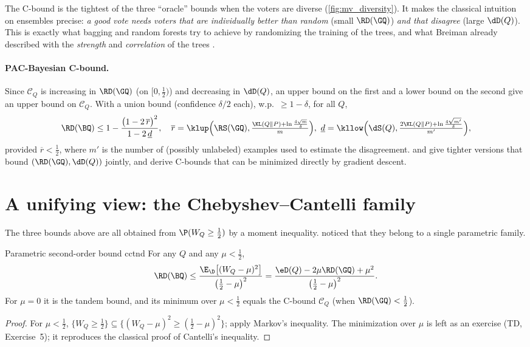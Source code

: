 The C-bound is the tightest of the three ``oracle'' bounds when the voters
are diverse (\cref{fig:mv_diversity}). It makes the classical intuition on
ensembles precise: \emph{a good vote needs voters that are individually
better than random} (small $\RD(\GQ)$) \emph{and that disagree} (large $\dD(Q)$).
This is exactly what bagging and random forests try to achieve by randomizing
the training of the trees, and what Breiman already described with the
\emph{strength} and \emph{correlation} of the trees \citep{breiman2001random}.

\paragraph{PAC-Bayesian C-bound.} Since $\mathcal C_Q$ is increasing in
$\RD(\GQ)$ (on $[0,\frac12)$) and decreasing in $\dD(Q)$, an upper bound on
the first and a lower bound on the second give an upper bound on $\mathcal C_Q$.
With a union bound (confidence $\delta/2$ each), w.p.\ $\geq1-\delta$, for all $Q$,
\begin{equation}\label{eq:cbound_pb}
\RD(\BQ)\leq1-\frac{\big(1-2\,\overline r\big)^2}{1-2\,\underline d},\quad
\overline r=\klup\Big(\RS(\GQ),\tfrac{\KL(Q\|P)+\ln\frac{4\sqrt m}{\delta}}{m}\Big),\
\underline d=\kllow\Big(\dS(Q),\tfrac{2\KL(Q\|P)+\ln\frac{4\sqrt {m'}}{\delta}}{m'}\Big),
\end{equation}
provided $\overline r<\frac12$, where $m'$ is the number of (possibly unlabeled)
examples used to estimate the disagreement. \citet{lacasse2007pac} and
\citet{germain2015risk} give tighter versions that bound $(\RD(\GQ),\dD(Q))$
jointly, and \citet{viallard2021self} derive C-bounds that can be minimized
directly by gradient descent.

\section{A unifying view: the Chebyshev--Cantelli family}\label{sec:cctnd}

The three bounds above are all obtained from $\P(W_Q\geq\frac12)$ by a
moment inequality. \citet{wu2021chebyshev} noticed that they belong to a
single parametric family.

\begin{theorem}{Parametric second-order bound \citep{wu2021chebyshev}}{cctnd}
For any $Q$ and any $\mu<\frac12$,
\begin{equation}\label{eq:cctnd}
\RD(\BQ)\leq\frac{\E_\D\big[(W_Q-\mu)^2\big]}{\big(\frac12-\mu\big)^2}
=\frac{\eD(Q)-2\mu\RD(\GQ)+\mu^2}{\big(\frac12-\mu\big)^2}.
\end{equation}
For $\mu=0$ it is the tandem bound, and its minimum over $\mu<\frac12$ equals
the C-bound $\mathcal C_Q$ (when $\RD(\GQ)<\frac12$).
\end{theorem}
\begin{proof}
For $\mu<\frac12$, $\{W_Q\geq\frac12\}\subseteq\{(W_Q-\mu)^2\geq(\frac12-\mu)^2\}$;
apply Markov's inequality. The minimization over $\mu$ is left as an exercise
(TD, Exercise~5); it reproduces the classical proof of Cantelli's inequality.
\end{proof}

